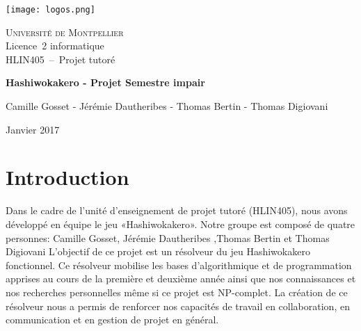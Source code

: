 \documentclass{article}
\begin{document}
\begin{titlepage}
  \begin{center}
    \texttt{[image: logos.png]}
    \vspace{1.5cm}

    \textsc{\LARGE Université de Montpellier}\\
    Licence~2 informatique\\
    HLIN405~--~Projet tutoré

    \vfill



    { \huge \bfseries Hashiwokakero - Projet Semestre impair \\[0.4cm] }

    \HRule
    \vfill


    \vfill

    \begin{minipage}{0.9\textwidth}

        Camille Gosset - Jérémie Dautheribes - Thomas Bertin - Thomas Digiovani

    \end{minipage}

    \vfill

    {\large Janvier 2017}
  \end{center}
\end{titlepage}



\section{\LARGE Introduction}
\hspace{0.5cm} Dans le cadre de l'unité d'enseignement de projet tutoré (HLIN405), nous avons développé en équipe le jeu «Hashiwokakero». Notre groupe est composé de quatre personnes: Camille Gosset, Jérémie Dautheribes ,Thomas Bertin et Thomas Digiovani
L’objectif de ce projet est un résolveur du jeu Hashiwokakero fonctionnel. Ce résolveur mobilise les bases d’algorithmique et de programmation apprises au cours de la première et deuxième année ainsi que nos connaissances et nos recherches personnelles même si ce projet est NP-complet. La création de ce résolveur nous a permis de renforcer nos capacités de travail en collaboration, en communication et en gestion de projet en général.
\end{document}

